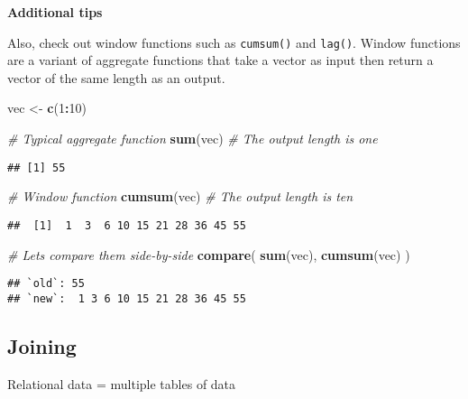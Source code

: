 \documentclass[
]{book}
\newenvironment{Shaded}{\begin{snugshade}}{\end{snugshade}}
\newcommand{\CommentTok}[1]{\textcolor[rgb]{0.56,0.35,0.01}{\textit{#1}}}
\newcommand{\DecValTok}[1]{\textcolor[rgb]{0.00,0.00,0.81}{#1}}
\newcommand{\KeywordTok}[1]{\textcolor[rgb]{0.13,0.29,0.53}{\textbf{#1}}}
\newcommand{\NormalTok}[1]{#1}
\newcommand{\OperatorTok}[1]{\textcolor[rgb]{0.81,0.36,0.00}{\textbf{#1}}}
\newcommand{\StringTok}[1]{\textcolor[rgb]{0.31,0.60,0.02}{#1}}
\begin{document}
\textbf{Additional tips}

Also, check out window functions such as \texttt{cumsum()} and \texttt{lag()}. Window functions are a variant of aggregate functions that take a vector as input then return a vector of the same length as an output.

\begin{Shaded}
\begin{Highlighting}[]
\NormalTok{vec \textless{}{-}}\StringTok{ }\KeywordTok{c}\NormalTok{(}\DecValTok{1}\OperatorTok{:}\DecValTok{10}\NormalTok{)}

\CommentTok{\# Typical aggregate function}
\KeywordTok{sum}\NormalTok{(vec) }\CommentTok{\# The output length is one}
\end{Highlighting}
\end{Shaded}

\begin{verbatim}
## [1] 55
\end{verbatim}

\begin{Shaded}
\begin{Highlighting}[]
\CommentTok{\# Window function}
\KeywordTok{cumsum}\NormalTok{(vec) }\CommentTok{\# The output length is ten}
\end{Highlighting}
\end{Shaded}

\begin{verbatim}
##  [1]  1  3  6 10 15 21 28 36 45 55
\end{verbatim}

\begin{Shaded}
\begin{Highlighting}[]
\CommentTok{\# Let\textquotesingle{}s compare them side{-}by{-}side}
\KeywordTok{compare}\NormalTok{(}
  \KeywordTok{sum}\NormalTok{(vec),}
  \KeywordTok{cumsum}\NormalTok{(vec)}
\NormalTok{)}
\end{Highlighting}
\end{Shaded}

\begin{verbatim}
## `old`: 55                         
## `new`:  1 3 6 10 15 21 28 36 45 55
\end{verbatim}

\hypertarget{joining}{%
\subsection{Joining}\label{joining}}

Relational data = multiple tables of data
\end{document}
